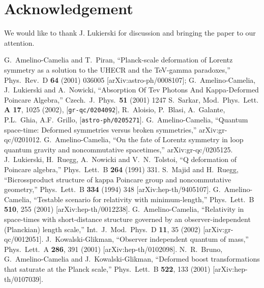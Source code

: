 \documentclass [12pt]  {article}
\begin{document}
\section*{Acknowledgement}

We would like to thank J. Lukierski for discussion and bringing
the paper \cite{Lukierski:2002ii} to our attention.



\begin{thebibliography}{99}
 G.~Amelino-Camelia and T.~Piran,
``Planck-scale deformation of Lorentz symmetry as a solution to
the UHECR  and the TeV-gamma paradoxes,'' Phys.\ Rev.\ D {\bf 64}
(2001) 036005 [arXiv:astro-ph/0008107]; G.~Amelino-Camelia,
J.~Lukierski and A.~Nowicki, ``Absorption Of Tev Photons And
Kappa-Deformed Poincare Algebra,'' Czech.\ J.\ Phys.\  {\bf 51}
(2001) 1247 S.~Sarkar, Mod.~Phys.~Lett.  {\bf A 17}, 1025 (2002),
[{\tt gr-qc/0204092}],  R.~Aloisio, P.~Blasi, A.~Galante,
P.L.~Ghia, A.F.~Grillo, [{\tt astro-ph/0205271}].
G.~Amelino-Camelia, ``Quantum space-time: Deformed symmetries
versus broken symmetries,'' arXiv:gr-qc/0201012.
G.~Amelino-Camelia, ``On the fate of Lorentz symmetry in loop
quantum gravity and  noncommutative spacetimes,''
arXiv:gr-qc/0205125.
 J.~Lukierski, H.~Ruegg, A.~Nowicki and V.~N.~Tolstoi,
``Q deformation of Poincare algebra,'' Phys.\ Lett.\ B {\bf 264}
(1991) 331.
 S.~Majid and H.~Ruegg,
``Bicrossproduct structure of kappa Poincare group and
noncommutative geometry,'' Phys.\ Lett.\ B {\bf 334} (1994) 348
[arXiv:hep-th/9405107].
G.~Amelino-Camelia, ``Testable scenario for relativity with
minimum-length,'' Phys.\ Lett.\ B {\bf 510}, 255 (2001)
[arXiv:hep-th/0012238].
G.~Amelino-Camelia, ``Relativity in space-times with
short-distance structure governed by an observer-independent
(Planckian) length scale,'' Int.\ J.\ Mod.\ Phys.\ D {\bf 11}, 35
(2002) [arXiv:gr-qc/0012051].
J.~Kowalski-Glikman, ``Observer independent quantum of mass,''
Phys.\ Lett.\ A {\bf 286}, 391 (2001) [arXiv:hep-th/0102098].
N.~R.~Bruno, G.~Amelino-Camelia and J.~Kowalski-Glikman,
``Deformed boost transformations that saturate at the Planck
scale,'' Phys.\ Lett.\ B {\bf 522}, 133 (2001)
[arXiv:hep-th/0107039].

\end{thebibliography}
\end{document}
